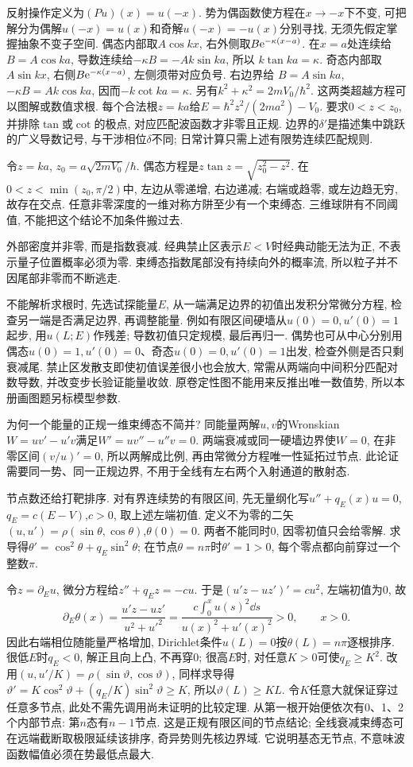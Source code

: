 反射操作定义为$(Pu)(x)=u(-x)$. 势为偶函数使方程在$x\to-x$下不变, 可把解分为偶解$u(-x)=u(x)$和奇解$u(-x)=-u(x)$分别寻找, 无须先假定掌握抽象不变子空间. 偶态内部取$A\cos kx$, 右外侧取$B\mathrm e^{-\kappa(x-a)}$. 在$x=a$处连续给$B=A\cos ka$, 导数连续给$-\kappa B=-Ak\sin ka$, 所以 $k\tan ka=\kappa$. 奇态内部取$A\sin kx$, 右侧$B\mathrm e^{-\kappa(x-a)}$, 左侧须带对应负号. 右边界给 $B=A\sin ka$, $-\kappa B=Ak\cos ka$, 因而$-k\cot ka=\kappa$. 另有$k^2+\kappa^2=2mV_0/\hbar^2$. 这两类超越方程可以图解或数值求根. 每个合法根$z=ka$给$E=\hbar^2z^2/(2ma^2)-V_0$. 要求$0<z<z_0$, 并排除$\tan$或$\cot$的极点, 对应匹配波函数才非零且正规. 边界的$\delta\prime$是描述集中跳跃的广义导数记号, 与干涉相位$\delta$不同; 日常计算只需上述有限势连续匹配规则.

令$z=ka$, $z_0=a\sqrt{2mV_0}/\hbar$. 偶态方程是$z\tan z=\sqrt{z_0^2-z^2}$. 在$0<z<\min(z_0,\pi/2)$中, 左边从零递增, 右边递减; 右端或趋零, 或左边趋无穷, 故存在交点. 任意非零深度的一维对称方阱至少有一个束缚态. 三维球阱有不同阈值, 不能把这个结论不加条件搬过去.

外部密度并非零, 而是指数衰减. 经典禁止区表示$E<V$时经典动能无法为正, 不表示量子位置概率必须为零. 束缚态指数尾部没有持续向外的概率流, 所以粒子并不因尾部非零而不断逃走.

不能解析求根时, 先选试探能量$E$, 从一端满足边界的初值出发积分常微分方程, 检查另一端是否满足边界, 再调整能量. 例如有限区间硬墙从$u(0)=0,u'(0)=1$起步, 用$u(L;E)$作残差; 导数初值只定规模, 最后再归一. 偶势也可从中心分别用偶态$u(0)=1,u'(0)=0$、奇态$u(0)=0,u'(0)=1$出发, 检查外侧是否只剩衰减尾. 禁止区发散支即使初值误差很小也会放大, 常需从两端向中间积分匹配对数导数, 并改变步长验证能量收敛. 原卷定性图不能用来反推出唯一数值势, 所以本册画图题另标模型参数.

为何一个能量的正规一维束缚态不简并? 同能量两解$u,v$的Wronskian$W=uv'-u'v$满足$W'=uv''-u''v=0$. 两端衰减或同一硬墙边界使$W=0$, 在非零区间$(v/u)'=0$, 所以两解成比例, 再由常微分方程唯一性延拓过节点. 此论证需要同一势、同一正规边界, 不用于全线有左右两个入射通道的散射态.

节点数还给打靶排序. 对有界连续势的有限区间, 先无量纲化写$u''+q_E(x)u=0$, $q_E=c(E-V)$,$c>0$, 取上述左端初值. 定义不为零的二矢$(u,u')=\rho(\sin\theta,\cos\theta)$,$\theta(0)=0$. 两者不能同时0, 因零初值只会给零解. 求导得$\theta'=\cos^2\theta+q_E\sin^2\theta$; 在节点$\theta=n\pi$时$\theta'=1>0$, 每个零点都向前穿过一个整数$\pi$.

令$z=\partial_Eu$, 微分方程给$z''+q_Ez=-cu$. 于是$(u'z-uz')'=cu^2$, 左端初值为0, 故
\[
\partial_E\theta(x)=\frac{u'z-uz'}{u^2+u'^2}
=\frac{c\int_0^xu(s)^2\dd s}{u(x)^2+u'(x)^2}>0,\qquad x>0.
\]
因此右端相位随能量严格增加, Dirichlet条件$u(L)=0$按$\theta(L)=n\pi$逐根排序. 很低$E$时$q_E<0$, 解正且向上凸, 不再穿0; 很高$E$时, 对任意$K>0$可使$q_E\geq K^2$. 改用$(u,u\prime/K)=\rho(\sin\vartheta,\cos\vartheta)$, 同样求导得$\vartheta\prime=K\cos^2\vartheta+(q_E/K)\sin^2\vartheta\geq K$, 所以$\vartheta(L)\geq KL$. 令$K$任意大就保证穿过任意多节点, 此处不需先调用尚未证明的比较定理. 从第一根开始便依次有0、1、2个内部节点: 第$n$态有$n-1$节点. 这是正规有限区间的节点结论; 全线衰减束缚态可在远端截断取极限延续该排序, 奇异势则先核边界域. 它说明基态无节点, 不意味波函数幅值必须在势最低点最大.

